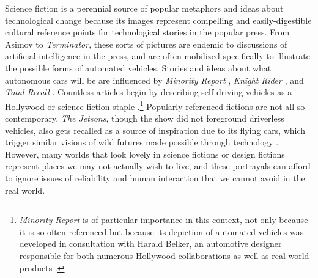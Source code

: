 

Science fiction is a perennial source of popular metaphors and ideas
about technological change because its
images represent compelling and easily-digestible
cultural reference 
points for technological stories in the popular press. From Asimov to
\emph{Terminator}, 
these sorts of pictures are endemic to discussions of artificial
intelligence in the press, and are often mobilized specifically to
illustrate the possible forms of automated vehicles. Stories and ideas
about what autonomous cars will be are
influenced by \emph{Minority Report} \cite{fromHollywood},
\emph{Knight Rider}
\cite{wadeKITT}, and \emph{Total
  Recall} \cite{pasdirtzSolution}. Countless articles begin by describing
self-driving vehicles as a Hollywood or science-fiction
staple \cite{scifiToReality}.\footnote{\emph{Minority Report} is of particular
importance in this context, not only because it is so often referenced
but because its depiction of automated vehicles was developed in
consultation with Harald Belker, an automotive designer responsible
for both numerous Hollywood collaborations as well as real-world
products \cite{melansonMinority}.} Popularly referenced fictions are
not all so contemporary. \emph{The Jetsons}, though
the show did not foreground driverless vehicles, also gets
recalled as a source of inspiration due to its flying cars,
which trigger similar visions of wild 
futures made possible through technology \cite{JetsonsAge}. However, many
worlds that look lovely in science fictions or design fictions represent places 
we may not actually wish to live, and these portrayals can afford to
ignore issues of reliability and human interaction that we cannot avoid
in the real world. 



